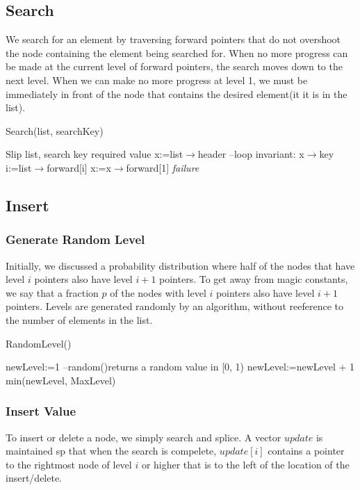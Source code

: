 \documentclass[10pt,english, openany]{book}
\begin{document}
\subsection{Search}
We search for an element by traversing forward pointers that do not overshoot the node containing the element being searched for. When no more progress can be made at the current level of forward pointers, the search moves down to the next level. When we can make no more progress at level 1, we must be immediately in front of the node that contains the desired element(it it is in the list).
\begin{algorithm}
\caption{Search(list, searchKey)}	
\begin{algorithmic}[1]
	 \Require Slip list, search key
	 \Ensure required value
	 \State x:=list$\rightarrow$header
	 \State --loop invariant: x$\rightarrow$key
	 	 
	 \State i:=list$\rightarrow$forward[i]
	 \EndWhile
	 \EndFor
	 \State x:=x$\rightarrow$forward[1]
	 \State {} 
	 \EndIf
	 \State \Return \textit{failure}
\end{algorithmic}
\end{algorithm}

\subsection{Insert}
\subsubsection{Generate Random Level}
Initially, we discussed a probability distribution where half of the nodes that have level $i$ pointers also have level $i+1$ pointers. To get away from magic constants, we say that a fraction $p$ of the nodes with level $i$ pointers also have level $i+1$ pointers. Levels are generated randomly by an algorithm, without reeference to the number of elements in the list.
\begin{algorithm}[htb]
\caption{RandomLevel()}	
\begin{algorithmic}[1]
	 \Require
	 \Ensure
	 \State newLevel:=1
	 \State --random()returns a random value in [0, 1)
	 \State newLevel:=newLevel + 1
	 \EndWhile
	 \State \Return min(newLevel, MaxLevel)
\end{algorithmic}
\end{algorithm}
\subsubsection{Insert Value}
To insert or delete a node, we simply search and splice. A vector $update$ is maintained sp that when the search is compelete, $update[i]$ contains a pointer to the rightmost node of level $i$ or higher that is to the left of the location of the insert/delete.
\end{document}
